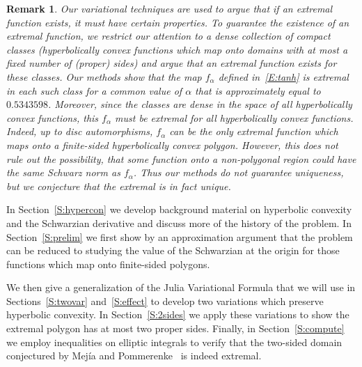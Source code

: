 \documentclass{lms}
\newtheorem{remark}[theorem]{Remark}
\numberwithin{equation}{section}
\begin{document}
\begin{remark}
Our variational techniques are used to argue that if an extremal
function exists, it must have certain properties.  
To guarantee the existence of an extremal function, we restrict our attention
to a dense collection of compact classes (hyperbolically convex
functions which map onto domains with at most a fixed number
of (proper) sides) and argue that an extremal function exists for these
classes.
Our methods show that the map $f_\alpha$ 
defined in~\eqref{E:tanh} 
is extremal in each such class for a common value of $\alpha$
that is approximately equal to $0.5343598$.
Moreover, since the classes are dense in the space of all hyperbolically 
convex functions, this $f_\alpha$ must be extremal for all hyperbolically
convex functions.  
Indeed, up to disc automorphisms, $f_\alpha$ can be the only extremal 
function which maps onto a finite-sided hyperbolically convex polygon.
However, this does not rule out the possibility, that some
function onto a non-polygonal region could have the same Schwarz
norm as $f_\alpha$. Thus our methods do not guarantee uniqueness,
but we conjecture that the extremal is in fact unique.
\end{remark}



In Section~\ref{S:hypercon} we develop background material on
hyperbolic convexity and the Schwarzian derivative and discuss more of
the history of the problem.  In Section~\ref{S:prelim}
we first show by an approximation 
argument that the problem can be reduced
to studying the value of the Schwarzian at the origin for those
functions which map onto finite-sided polygons.


We then give a generalization of the Julia Variational Formula that
we will use in Sections~\ref{S:twovar} and~\ref{S:effect} to develop
two variations which preserve hyperbolic convexity. 
In Section~\ref{S:2sides} we  apply these variations to show the 
 extremal polygon has at most two proper sides.
Finally, in Section~\ref{S:compute} we employ inequalities on 
elliptic integrals to verify that the
two-sided domain conjectured by Mej\'ia and
Pommerenke~\cite{MP00,MP01,PM00} is indeed extremal.
\end{document}
